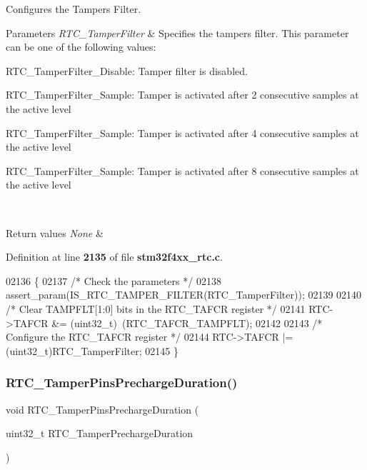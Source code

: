 Configures the Tampers Filter. 


\begin{DoxyParams}{Parameters}
{\em R\+T\+C\+\_\+\+Tamper\+Filter} & Specifies the tampers filter. This parameter can be one of the following values\+: \begin{DoxyItemize}
\item R\+T\+C\+\_\+\+Tamper\+Filter\+\_\+\+Disable\+: Tamper filter is disabled. \item R\+T\+C\+\_\+\+Tamper\+Filter\+\_\+Sample\+: Tamper is activated after 2 consecutive samples at the active level \item R\+T\+C\+\_\+\+Tamper\+Filter\+\_\+Sample\+: Tamper is activated after 4 consecutive samples at the active level \item R\+T\+C\+\_\+\+Tamper\+Filter\+\_\+Sample\+: Tamper is activated after 8 consecutive samples at the active level \end{DoxyItemize}
\\
\hline
\end{DoxyParams}

\begin{DoxyRetVals}{Return values}
{\em None} & \\
\hline
\end{DoxyRetVals}


Definition at line \textbf{ 2135} of file \textbf{ stm32f4xx\+\_\+rtc.\+c}.


\begin{DoxyCode}
02136 \{
02137   \textcolor{comment}{/* Check the parameters */}
02138   assert_param(IS_RTC_TAMPER_FILTER(RTC\_TamperFilter));
02139    
02140   \textcolor{comment}{/* Clear TAMPFLT[1:0] bits in the RTC\_TAFCR register */}
02141   RTC->TAFCR &= (uint32\_t)~(RTC_TAFCR_TAMPFLT);
02142 
02143   \textcolor{comment}{/* Configure the RTC\_TAFCR register */}
02144   RTC->TAFCR |= (uint32\_t)RTC\_TamperFilter;
02145 \}
\end{DoxyCode}
\mbox{\label{group__RTC__Group9_gafc176a013076a651862dc6a957286025}} 
\subsubsection{R\+T\+C\+\_\+\+Tamper\+Pins\+Precharge\+Duration()}
{\footnotesize\ttfamily void R\+T\+C\+\_\+\+Tamper\+Pins\+Precharge\+Duration (\begin{DoxyParamCaption}\item[{uint32\+\_\+t}]{R\+T\+C\+\_\+\+Tamper\+Precharge\+Duration }\end{DoxyParamCaption})}



